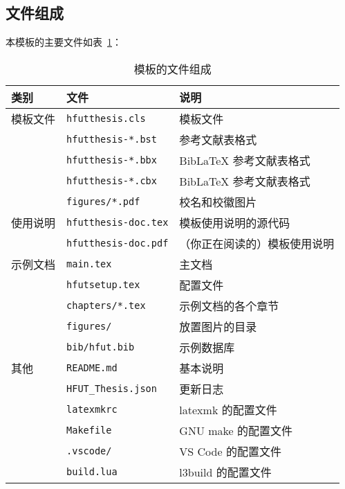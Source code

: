 \documentclass[a4paper]{ltxdoc}
\DeclareRobustCommand\file{\nolinkurl}
\begin{document}
\subsection{文件组成}
本模板的主要文件如表~\ref{tab:files}：
\begin{table}[htb]
  \centering\small
  \caption{模板的文件组成}
  \label{tab:files}
  \begin{tabular}{lll}
    \toprule
    类别     & 文件                      & 说明                         \\
    \midrule
    模板文件 & \file{hfutthesis.cls}     & 模板文件                     \\
             & \file{hfutthesis-*.bst}   & \BibTeX{} 参考文献表格式     \\
             & \file{hfutthesis-*.bbx}   & BibLaTeX 参考文献表格式      \\
             & \file{hfutthesis-*.cbx}   & BibLaTeX 参考文献表格式      \\
             & \file{figures/*.pdf} & 校名和校徽图片               \\
    \midrule
    使用说明 & \file{hfutthesis-doc.tex} & 模板使用说明的源代码         \\
             & \file{hfutthesis-doc.pdf} & （你正在阅读的）模板使用说明 \\
    \midrule
    示例文档 & \file{main.tex}           & 主文档                       \\
             & \file{hfutsetup.tex}      & 配置文件                     \\
             & \file{chapters/*.tex}     & 示例文档的各个章节           \\
             & \file{figures/}           & 放置图片的目录               \\
             & \file{bib/hfut.bib}       & \BibTeX{} 示例数据库         \\
    \midrule
    其他     & \file{README.md}          & 基本说明                     \\
             & \file{HFUT_Thesis.json}       & 更新日志                 \\
             & \file{latexmkrc}          & latexmk 的配置文件           \\
             & \file{Makefile}           & GNU make 的配置文件          \\
             & \file{.vscode/}           & VS Code 的配置文件           \\
             & \file{build.lua}          & l3build 的配置文件           \\
    \bottomrule
  \end{tabular}
\end{table}
\end{document}
